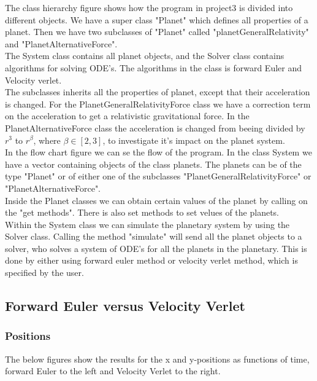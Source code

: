 \documentclass{article}
\begin{document}
The class hierarchy figure shows how the program in project3 is divided into different objects. We have a super class "Planet" which defines all properties of a planet. Then we have two subclasses of "Planet" called "planetGeneralRelativity" and "PlanetAlternativeForce".\\ 

The System class contains all planet objects, and the Solver class contains algorithms for solving ODE's. The algorithms in the class is forward Euler and Velocity verlet.\\

The subclasses inherits all the properties of planet, except that their acceleration is changed. For the PlanetGeneralRelativityForce class we have a correction term on the acceleration to get a relativistic gravitational force. In the PlanetAlternativeForce class the acceleration is changed from beeing divided by $r^3$ to $r^{\beta}$, where $\beta \in [2,3]$, to investigate it's impact on the planet system.\\  

In the flow chart figure we can se the flow of the program. In the class System we have a vector containing objects of the class planets. The planets can be of the type "Planet" or of either one of the subclasses "PlanetGeneralRelativityForce" or "PlanetAlternativeForce".\\ 

Inside the Planet classes we can obtain certain values of the planet by calling on the "get methods". There is also set methods to set velues of the planets. \\

Within the System class we can simulate the planetary system by using the Solver class. Calling the method "simulate" will send all the planet objects to a solver, who solves a system of ODE's for all the planets in the planetary. This is done by either using forward euler method or velocity verlet method, which is specified by the user. 

\subsection{Forward Euler versus Velocity Verlet}

\subsubsection{Positions}
The below figures show the results for the x and y-positions as functions of time, forward Euler to the left and Velocity Verlet to the right. 
\end{document}
